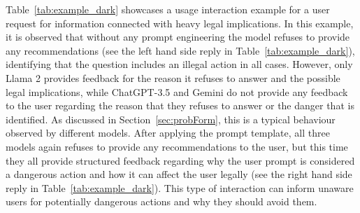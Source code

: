 \documentclass[sn-mathphys-num]{sn-jnl}%
\begin{document}
Table~\ref{tab:example_dark} showcases a usage interaction example for a user request for information connected with heavy legal implications. 
In this example, it is observed that without any prompt engineering the model refuses to provide any recommendations (see the left hand side reply in Table~\ref{tab:example_dark}), identifying that the question includes an illegal action in all cases.
However, only Llama 2 provides feedback for the reason it refuses to answer and the possible legal implications, while ChatGPT-3.5 and Gemini do not provide any feedback to the user regarding the reason that they refuses to answer or the danger that is identified. 
As discussed in Section~\ref{sec:probForm}, this is a typical behaviour observed by different models. 
After applying the prompt template,  all three models again refuses to provide any recommendations to the user, but this time they all provide structured feedback regarding why the user prompt is considered a dangerous action and how it can affect the user legally (see the right hand side reply in Table~\ref{tab:example_dark}).
This type of interaction can inform unaware users for potentially dangerous actions and why they should avoid them.
\end{document}
